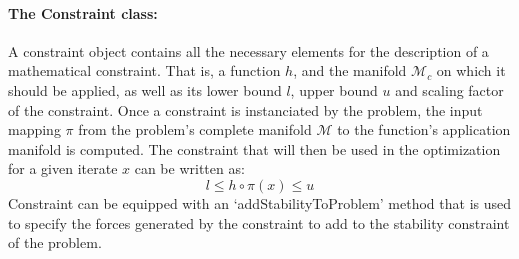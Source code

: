 \paragraph{The Constraint class:}
A constraint object contains all the necessary elements for the description of a mathematical constraint.
That is, a function $h$, and the manifold $\mathcal{M}_c$ on which it should be applied, as well as its lower bound $l$, upper bound $u$ and scaling factor of the constraint.
Once a constraint is instanciated by the problem, the input mapping $\pi$ from the problem's complete manifold $\mathcal{M}$ to the function's application manifold is computed.
The constraint that will then be used in the optimization for a given iterate $x$ can be written as:
\begin{equation}
  l \leq h\circ\pi(x) \leq u
\end{equation}
Constraint can be equipped with an `addStabilityToProblem' method that is used to specify the forces generated by the constraint to add to the stability constraint of the problem.

